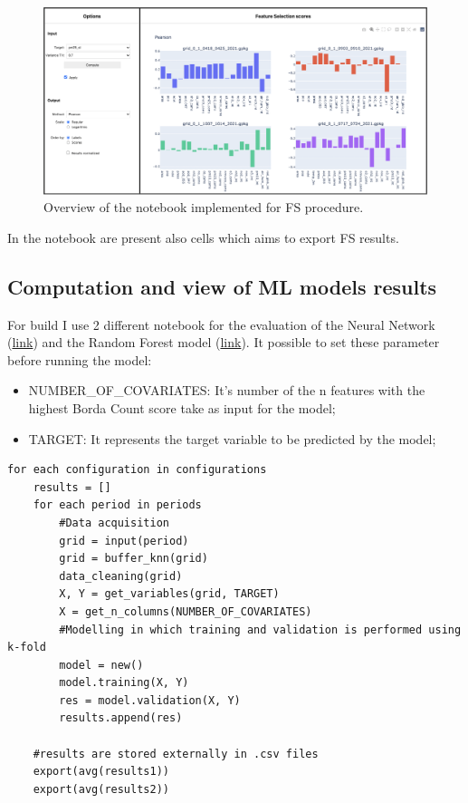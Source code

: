 \begin{figure}[H]
    \centering
    \includegraphics[scale=0.40]{images/notebook.png}
    \caption{Overview of the notebook implemented for FS procedure.}
    \label{fig:notebook}
\end{figure}

In the notebook are present also cells which aims to export FS results.

\subsection{Computation and view of ML models results}
For build I use 2 different notebook for the evaluation of the Neural Network (\href{https://github.com/opengeolab/D-DUST/blob/thesis_MB/notebooks/Keras_prediction_model.ipynb}{link}) and the Random Forest model (\href{https://github.com/opengeolab/D-DUST/blob/thesis_MB/notebooks/RandomForest_prediction_model.ipynb}{link}). 
It possible to set these parameter before running the model:
\begin{itemize}
    \item NUMBER\_OF\_COVARIATES: It's number of the n features with the highest Borda Count score take as input for the model;
    \item TARGET: It represents the target variable to be predicted by the model;
\end{itemize}
\begin{verbatim}
for each configuration in configurations
    results = []
    for each period in periods
        #Data acquisition
        grid = input(period)
        grid = buffer_knn(grid)
        data_cleaning(grid)
        X, Y = get_variables(grid, TARGET)
        X = get_n_columns(NUMBER_OF_COVARIATES)
        #Modelling in which training and validation is performed using k-fold
        model = new()
        model.training(X, Y)
        res = model.validation(X, Y)
        results.append(res)
    
    #results are stored externally in .csv files
    export(avg(results1))
    export(avg(results2))
 
\end{verbatim}

